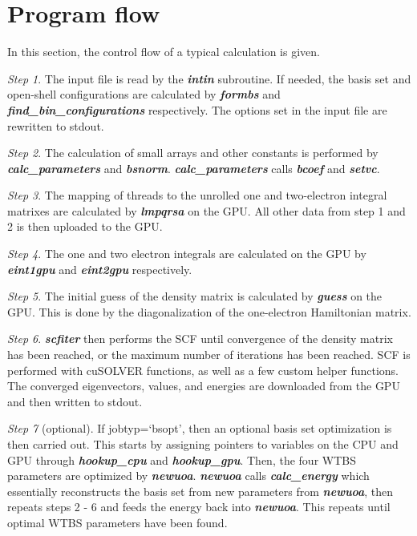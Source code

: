 \documentclass[12pt]{report}
\begin{document}
\section{Program flow}
In this section, the control flow of a typical calculation is given.

\textit{Step 1}. The input file is read by the \textit{\textbf{intin}} subroutine. If needed, the basis set and open-shell configurations are calculated by \textit{\textbf{formbs}} and \textit{\textbf{find\_bin\_configurations}} respectively. The options set in the input file are rewritten to stdout.

\textit{Step 2}. The calculation of small arrays and other constants is performed by \textit{\textbf{calc\_parameters}} and \textit{\textbf{bsnorm}}. \textit{\textbf{calc\_parameters}} calls \textit{\textbf{bcoef}} and \textit{\textbf{setvc}}.

\textit{Step 3}. The mapping of threads to the unrolled one and two-electron integral matrixes are calculated by \textit{\textbf{lmpqrsa}} on the GPU. All other data from step 1 and 2 is then uploaded to the GPU.

\textit{Step 4}. The one and two electron integrals are calculated on the GPU by \textit{\textbf{eint1gpu}} and \textit{\textbf{eint2gpu}} respectively.

\textit{Step 5}. The initial guess of the density matrix is calculated by \textit{\textbf{guess}} on the GPU. This is done by the diagonalization of the one-electron Hamiltonian matrix.

\textit{Step 6}. \textit{\textbf{scfiter}} then performs the SCF until convergence of the density matrix has been reached, or the maximum number of iterations has been reached. SCF is performed with cuSOLVER functions, as well as a few custom helper functions. The converged eigenvectors, values, and energies are downloaded from the GPU and then written to stdout.

\textit{Step 7} (optional). If jobtyp=`bsopt', then an optional basis set optimization is then carried out. This starts by assigning pointers to variables on the CPU and GPU through \textit{\textbf{hookup\_cpu}} and \textit{\textbf{hookup\_gpu}}. Then, the four WTBS parameters are optimized by \textit{\textbf{newuoa}}. \textit{\textbf{newuoa}} calls \textit{\textbf{calc\_energy}} which essentially reconstructs the basis set from new parameters from \textit{\textbf{newuoa}}, then repeats steps 2 - 6 and feeds the energy back into \textit{\textbf{newuoa}}. This repeats until optimal WTBS parameters have been found.
\end{document}

